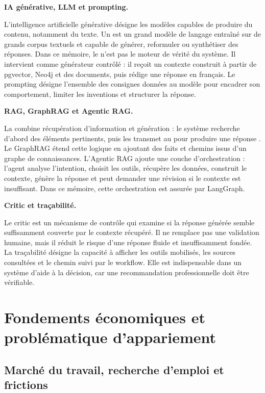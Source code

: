 \medskip
\noindent\textbf{IA générative, LLM et prompting.}

L'intelligence artificielle générative désigne les modèles capables de produire du contenu, notamment du texte. Un \LLM{} est un grand modèle de langage entraîné sur de grands corpus textuels et capable de générer, reformuler ou synthétiser des réponses. Dans ce mémoire, le \LLM{} n'est pas le moteur de vérité du système. Il intervient comme générateur contrôlé : il reçoit un contexte construit à partir de pgvector, Neo4j et des documents, puis rédige une réponse en français. Le prompting désigne l'ensemble des consignes données au modèle pour encadrer son comportement, limiter les inventions et structurer la réponse.

\medskip
\noindent\textbf{RAG, GraphRAG et Agentic RAG.}

La \RAG{} combine récupération d'information et génération : le système recherche d'abord des éléments pertinents, puis les transmet au \LLM{} pour produire une réponse \cite{lewis2020rag}. Le GraphRAG étend cette logique en ajoutant des faits et chemins issus d'un graphe de connaissances. L'Agentic RAG ajoute une couche d'orchestration : l'agent analyse l'intention, choisit les outils, récupère les données, construit le contexte, génère la réponse et peut demander une révision si le contexte est insuffisant. Dans ce mémoire, cette orchestration est assurée par LangGraph.

\medskip
\noindent\textbf{Critic et traçabilité.}

Le critic est un mécanisme de contrôle qui examine si la réponse générée semble suffisamment couverte par le contexte récupéré. Il ne remplace pas une validation humaine, mais il réduit le risque d'une réponse fluide et insuffisamment fondée. La traçabilité désigne la capacité à afficher les outils mobilisés, les sources consultées et le chemin suivi par le workflow. Elle est indispensable dans un système d'aide à la décision, car une recommandation professionnelle doit être vérifiable.

\section{Fondements économiques et problématique d'appariement}

\subsection{Marché du travail, recherche d'emploi et frictions}

